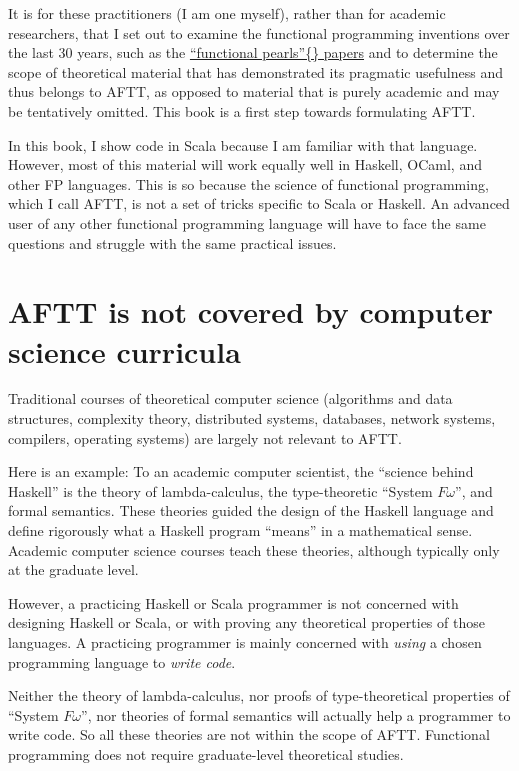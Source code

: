 It is for these practitioners (I am one myself), rather than for academic
researchers, that I set out to examine the functional programming
inventions over the last 30 years, \textendash{} such as the \href{https://wiki.haskell.org/Research_papers/Functional_pearls}{\textquotedblleft functional pearls\textquotedblright\{\} papers}
\textendash{} and to determine the scope of theoretical material that
has demonstrated its pragmatic usefulness and thus belongs to AFTT,
as opposed to material that is purely academic and may be tentatively
omitted. This book is a first step towards formulating AFTT.

In this book, I show code in Scala because I am familiar with that
language. However, most of this material will work equally well in
Haskell, OCaml, and other FP languages. This is so because the science
of functional programming, which I call AFTT, is not a set of tricks
specific to Scala or Haskell. An advanced user of any other functional
programming language will have to face the same questions and struggle
with the same practical issues.

\section{AFTT is not covered by computer science curricula}

Traditional courses of theoretical computer science (algorithms and
data structures, complexity theory, distributed systems, databases,
network systems, compilers, operating systems) are largely not relevant
to AFTT.

Here is an example: To an academic computer scientist, the ``science
behind Haskell'' is the theory of lambda-calculus, the type-theoretic
``System $F\omega$'', and formal semantics. These theories guided
the design of the Haskell language and define rigorously what a Haskell
program ``means'' in a mathematical sense. Academic computer science
courses teach these theories, although typically only at the graduate
level. 

However, a practicing Haskell or Scala programmer is not concerned
with designing Haskell or Scala, or with proving any theoretical properties
of those languages. A practicing programmer is mainly concerned with
\emph{using} a chosen programming language to \emph{write code}. 

Neither the theory of lambda-calculus, nor proofs of type-theoretical
properties of ``System $F\omega$'', nor theories of formal semantics
will actually help a programmer to write code. So all these theories
are not within the scope of AFTT. Functional programming does not
require graduate-level theoretical studies.

